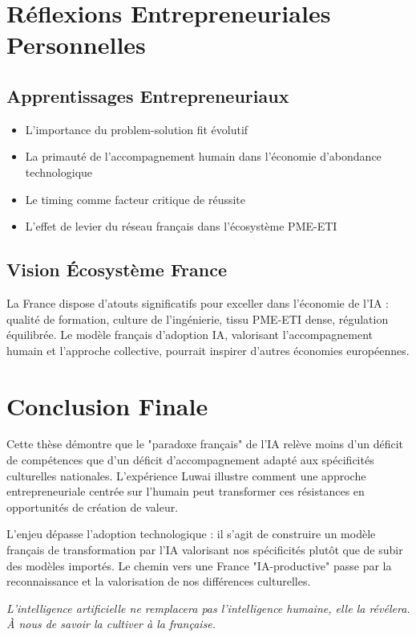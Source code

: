 \documentclass[12pt,a4paper]{report}
\begin{document}
\section{Réflexions Entrepreneuriales Personnelles}

\subsection{Apprentissages Entrepreneuriaux}
\begin{itemize}
\item L'importance du problem-solution fit évolutif
\item La primauté de l'accompagnement humain dans l'économie d'abondance technologique
\item Le timing comme facteur critique de réussite
\item L'effet de levier du réseau français dans l'écosystème PME-ETI
\end{itemize}

\subsection{Vision Écosystème France}
La France dispose d'atouts significatifs pour exceller dans l'économie de l'IA : qualité de formation, culture de l'ingénierie, tissu PME-ETI dense, régulation équilibrée. Le modèle français d'adoption IA, valorisant l'accompagnement humain et l'approche collective, pourrait inspirer d'autres économies européennes.

\section{Conclusion Finale}

Cette thèse démontre que le "paradoxe français" de l'IA relève moins d'un déficit de compétences que d'un déficit d'accompagnement adapté aux spécificités culturelles nationales. L'expérience Luwai illustre comment une approche entrepreneuriale centrée sur l'humain peut transformer ces résistances en opportunités de création de valeur.

L'enjeu dépasse l'adoption technologique : il s'agit de construire un modèle français de transformation par l'IA valorisant nos spécificités plutôt que de subir des modèles importés. Le chemin vers une France "IA-productive" passe par la reconnaissance et la valorisation de nos différences culturelles.

\emph{L'intelligence artificielle ne remplacera pas l'intelligence humaine, elle la révélera. À nous de savoir la cultiver à la française.}
\end{document}
